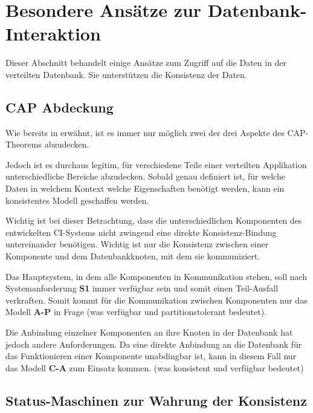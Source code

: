 \section{Besondere Ansätze zur Datenbank-Interaktion}
\label{sec:design:bes-ansaetze}

Dieser Abschnitt behandelt einige Ansätze zum Zugriff auf die Daten in der verteilten Datenbank.
Sie unterstützen die Konsistenz der Daten.



\subsection{CAP Abdeckung}

Wie bereits in  erwähnt,
ist es immer nur möglich zwei der drei Aspekte des CAP-Theorems abzudecken.

Jedoch ist es durchaus legitim, für verschiedene Teile
einer verteilten Applikation unterschiedliche Bereiche abzudecken.
Sobald genau definiert ist, für welche Daten in welchem Kontext welche Eigenschaften benötigt werden,
kann ein konsistentes Modell geschaffen werden.

Wichtig ist bei dieser Betrachtung, dass die unterschiedlichen Komponenten des entwickelten CI-Systems
nicht zwingend eine direkte Konsistenz-Bindung untereinander benötigen.
Wichtig ist nur die Konsistenz zwischen einer Komponente
und dem Datenbankknoten, mit dem sie kommuniziert.

Das Hauptsystem, in dem alle Komponenten in Kommunikation stehen,
soll nach Systemanforderung \textbf{S1} immer verfügbar sein und somit einen Teil-Ausfall  verkraften.
Somit kommt für die Kommunikation zwischen Komponenten nur das Modell \textbf{A-P} in Frage
(was verfügbar und partitionstolerant bedeutet).

Die Anbindung einzelner Komponenten an ihre Knoten in der Datenbank hat jedoch andere Anforderungen.
Da eine direkte Anbindung an die Datenbank für das Funktionieren einer Komponente unabdingbar ist,
kann in diesem Fall nur das Modell \textbf{C-A} zum Einsatz kommen.
(was konsistent und verfügbar bedeutet)



\subsection{Status-Maschinen zur Wahrung der Konsistenz}

